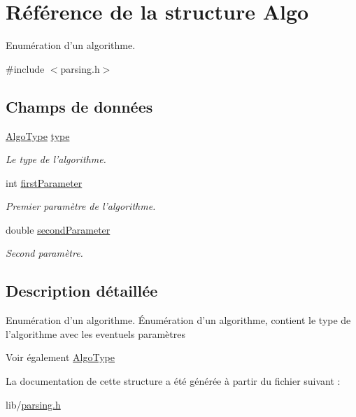 \hypertarget{structAlgo}{
\section{Référence de la structure Algo}
\label{structAlgo}
}


Enumération d'un algorithme.  




{\ttfamily \#include $<$parsing.h$>$}

\subsection*{Champs de données}
\begin{DoxyCompactItemize}
\item 
\hypertarget{structAlgo_ac238c59b48a6658c527f7ee987e0daac}{
\hyperlink{parsing_8h_aebdeb51354d2ee712846a9e02786cd74}{AlgoType} \hyperlink{structAlgo_ac238c59b48a6658c527f7ee987e0daac}{type}}
\label{structAlgo_ac238c59b48a6658c527f7ee987e0daac}

\begin{DoxyCompactList}\small\item\em Le type de l'algorithme. \item\end{DoxyCompactList}\item 
\hypertarget{structAlgo_a715ddb57a67fbadc6771d167f20d1d2e}{
int \hyperlink{structAlgo_a715ddb57a67fbadc6771d167f20d1d2e}{firstParameter}}
\label{structAlgo_a715ddb57a67fbadc6771d167f20d1d2e}

\begin{DoxyCompactList}\small\item\em Premier paramètre de l'algorithme. \item\end{DoxyCompactList}\item 
\hypertarget{structAlgo_a561dbbc9199b5f8cecaabfb3a19205c9}{
double \hyperlink{structAlgo_a561dbbc9199b5f8cecaabfb3a19205c9}{secondParameter}}
\label{structAlgo_a561dbbc9199b5f8cecaabfb3a19205c9}

\begin{DoxyCompactList}\small\item\em Second paramètre. \item\end{DoxyCompactList}\end{DoxyCompactItemize}


\subsection{Description détaillée}
Enumération d'un algorithme. Énumération d'un algorithme, contient le type de l'algorithme avec les eventuels paramètres

\begin{DoxySeeAlso}{Voir également}
\hyperlink{parsing_8h_aebdeb51354d2ee712846a9e02786cd74}{AlgoType} 
\end{DoxySeeAlso}


La documentation de cette structure a été générée à partir du fichier suivant :\begin{DoxyCompactItemize}
\item 
lib/\hyperlink{parsing_8h}{parsing.h}\end{DoxyCompactItemize}
